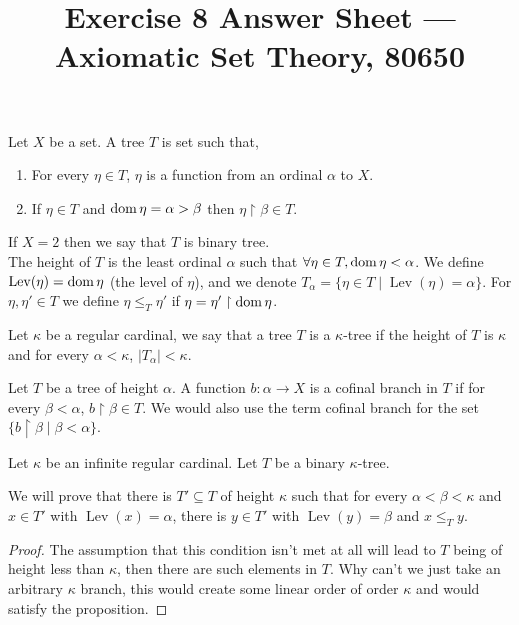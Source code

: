 
\title{Exercise 8 Answer Sheet --- Axiomatic Set Theory, 80650}

\DeclareMathOperator{\crit}{crit}


\maketitle
\maketitleprint{}

\question{}
\begin{definition}
	Let $X$ be a set. A tree $T$ is set such that,
	\begin{enumerate}
		\item For every $\eta \in T$, $\eta$ is a function from an ordinal $\alpha$ to $X$.
		\item If $\eta \in T$ and $\operatorname{dom} \eta = \alpha > \beta$ then $\eta \restriction \beta \in T$.
	\end{enumerate}
	If $X = 2$ then we say that $T$ is binary tree. \\
	The height of $T$ is the least ordinal $\alpha$ such that $\forall \eta \in T, \operatorname{dom} \eta < \alpha$.
	We define $\operatorname{Lev}(\eta) = \operatorname{dom} \eta$ (the level of $\eta$), and we denote $T_\alpha = \{\eta \in T \mid \operatorname{Lev}(\eta) = \alpha\}$.
	For $\eta, \eta' \in T$ we define $\eta \le_T \eta'$ if $\eta = \eta' \restriction \operatorname{dom} \eta$.
\end{definition}
\begin{definition}
	Let $\kappa$ be a regular cardinal, we say that a tree $T$ is a $\kappa$-tree if the height of $T$ is $\kappa$ and for every $\alpha < \kappa$, $|T_\alpha| < \kappa$.
\end{definition}
\begin{definition}
	Let $T$ be a tree of height $\alpha$.
	A function $b : \alpha \to X$ is a cofinal branch in $T$ if for every $\beta < \alpha$, $b \restriction \beta \in T$.
	We would also use the term cofinal branch for the set $\{ b \restriction \beta \mid \beta < \alpha \}$.
\end{definition}

Let $\kappa$ be an infinite regular cardinal.
Let $T$ be a binary $\kappa$-tree.

We will prove that there is $T' \subseteq T$ of height $\kappa$ such that for every $\alpha < \beta < \kappa$ and $x \in T'$ with $\operatorname{Lev}(x) = \alpha$,
there is $y \in T'$ with $\operatorname{Lev}(y) = \beta$ and $x \le_T y$.
\begin{proof}
	The assumption that this condition isn't met at all will lead to $T$ being of height less than $\kappa$, then there are such elements in $T$.
	Why can't we just take an arbitrary $\kappa$ branch, this would create some linear order of order $\kappa$ and would satisfy the proposition.
\end{proof}

